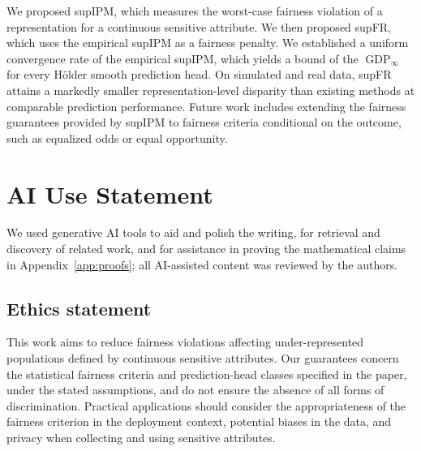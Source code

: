 \documentclass{article} %
\begin{document}


We proposed supIPM, which measures the worst-case fairness violation of a representation for a continuous sensitive attribute. We then proposed supFR, which uses the empirical supIPM as a fairness penalty.
We established a uniform convergence rate of the empirical supIPM, which yields a bound of the $\operatorname{GDP}_{\infty}$ for every  H\"older smooth prediction head.
On simulated and real data, supFR attains a markedly smaller representation-level disparity than existing methods at comparable prediction performance.
Future work includes extending the fairness guarantees provided by supIPM to fairness criteria conditional on the outcome, such as equalized odds or equal opportunity.


\section*{AI Use Statement}

We used generative AI tools to aid and polish the writing, for retrieval and discovery of related work, and for assistance in proving the mathematical claims in Appendix~\ref{app:proofs}; all AI-assisted content was reviewed by the authors.

\subsection*{Ethics statement}
This work aims to reduce fairness violations affecting under-represented populations defined by continuous sensitive attributes. Our guarantees concern the statistical fairness criteria and prediction-head classes specified in the paper, under the stated assumptions, and do not ensure the absence of all forms of discrimination. Practical applications should consider the appropriateness of the fairness criterion in the deployment context, potential biases in the data, and privacy when collecting and using sensitive attributes.
\end{document}
